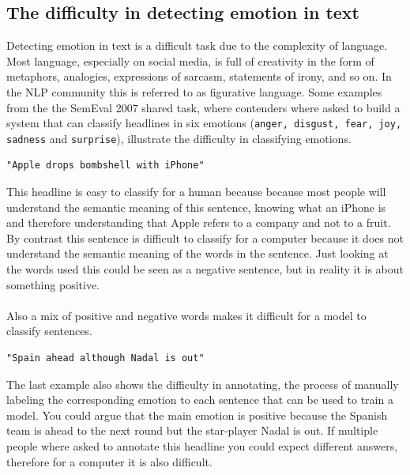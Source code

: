 \documentclass[
10pt, %
a4paper, %
oneside, %
headinclude,footinclude, %
BCOR5mm, %
]{scrartcl}
\begin{document}
\subsection{The difficulty in detecting emotion in text}
Detecting emotion in text is a difficult task due to the complexity of language. Most language, especially on social media, is full of creativity in the form of metaphors, analogies, expressions of sarcasm, statements of irony, and so on. In the NLP community this is referred to as figurative language. Some examples from the the SemEval 2007 shared task, where contenders where asked to build a system that can classify headlines in six emotions (\texttt{anger, disgust, fear, joy, sadness} and \texttt{surprise}), illustrate the difficulty in classifying emotions.
\begin{lstlisting}
"Apple drops bombshell with iPhone"
\end{lstlisting}
This headline is easy to classify for a human because because most people will understand the semantic meaning of this sentence, knowing what an iPhone is and therefore understanding that Apple refers to a company and not to a fruit. By contrast this sentence is difficult to classify for a computer because it does not understand the semantic meaning of the words in the sentence. Just looking at the words used this could be seen as a negative sentence, but in reality it is about something positive. \\\\
Also a mix of positive and negative words makes it difficult for a model to classify sentences.
\begin{lstlisting}
"Spain ahead although Nadal is out"
\end{lstlisting}
The last example also shows the difficulty in annotating, the process of manually labeling the corresponding emotion to each sentence that can be used to train a model. You could argue that the main emotion is positive because the Spanish team is ahead to the next round but the star-player Nadal is out. If multiple people where asked to annotate this headline you could expect different answers, therefore for a computer it is also difficult. 
\end{document}
